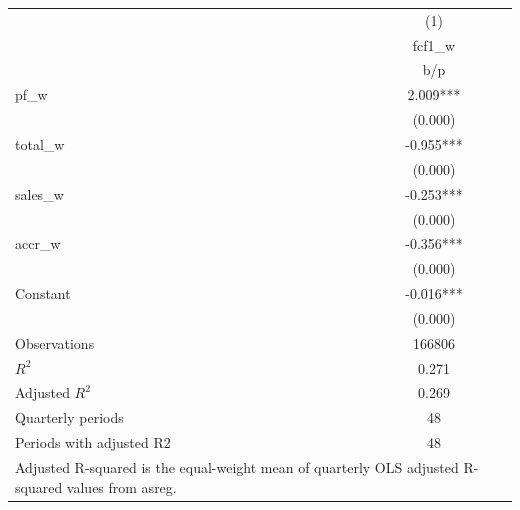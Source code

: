 {
\def\sym#1{\ifmmode^{#1}\else\(^{#1}\)\fi}
\begin{tabular}{l*{1}{c}}
\hline\hline
                    &\multicolumn{1}{c}{(1)}\\
                    &\multicolumn{1}{c}{fcf1\_w}\\
                    &         b/p   \\
\hline
pf\_w                &       2.009***\\
                    &     (0.000)   \\
total\_w             &      -0.955***\\
                    &     (0.000)   \\
sales\_w             &      -0.253***\\
                    &     (0.000)   \\
accr\_w              &      -0.356***\\
                    &     (0.000)   \\
Constant            &      -0.016***\\
                    &     (0.000)   \\
\hline
Observations        &      166806   \\
\(R^{2}\)           &       0.271   \\
Adjusted \(R^{2}\)  &       0.269   \\
Quarterly periods   &          48   \\
Periods with adjusted R2&          48   \\
\hline\hline
\multicolumn{2}{l}{\footnotesize Adjusted R-squared is the equal-weight mean of quarterly OLS adjusted R-squared values from asreg.}\\
\end{tabular}
}
